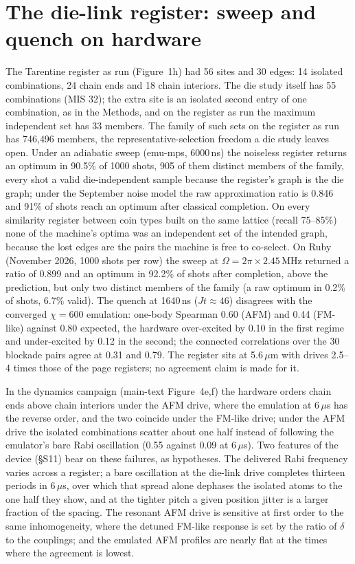 \documentclass[11pt,a4paper]{article}
\begin{document}
\section{The die-link register: sweep and quench on hardware}
\label{sec:si_die}
The Tarentine register as run (Figure~1h) had 56 sites and 30 edges: 14 isolated combinations, 24 chain ends and 18 chain interiors. The die study itself has 55 combinations (MIS 32); the extra site is an isolated second entry of one combination, as in the Methods, and on the register as run the maximum independent set has 33 members. The family of such sets on the register as run has 746{,}496 members, the representative-selection freedom a die study leaves open. Under an adiabatic sweep (emu-mps, 6000\,ns) the noiseless register returns an optimum in 90.5\% of 1000 shots, 905 of them distinct members of the family, every shot a valid die-independent sample because the register's graph is the die graph; under the September noise model the raw approximation ratio is 0.846 and 91\% of shots reach an optimum after classical completion. On every similarity register between coin types built on the same lattice (recall 75--85\%) none of the machine's optima was an independent set of the intended graph, because the lost edges are the pairs the machine is free to co-select. On Ruby (November 2026, 1000 shots per row) the sweep at $\Omega=2\pi\times2.45$\,MHz returned a ratio of 0.899 and an optimum in 92.2\% of shots after completion, above the prediction, but only two distinct members of the family (a raw optimum in 0.2\% of shots, 6.7\% valid). The quench at 1640\,ns ($Jt\approx46$) disagrees with the converged $\chi=600$ emulation: one-body Spearman 0.60 (AFM) and 0.44 (FM-like) against 0.80 expected, the hardware over-excited by 0.10 in the first regime and under-excited by 0.12 in the second; the connected correlations over the 30 blockade pairs agree at 0.31 and 0.79. The register sits at 5.6\,$\mu$m with drives 2.5--4 times those of the page registers; no agreement claim is made for it.

In the dynamics campaign (main-text Figure~4e,f) the hardware orders chain ends above chain interiors under the AFM drive, where the emulation at 6\,$\mu$s has the reverse order, and the two coincide under the FM-like drive; under the AFM drive the isolated combinations scatter about one half instead of following the emulator's bare Rabi oscillation (0.55 against 0.09 at 6\,$\mu$s). Two features of the device (\S S11) bear on these failures, as hypotheses. The delivered Rabi frequency varies across a register; a bare oscillation at the die-link drive completes thirteen periods in 6\,$\mu$s, over which that spread alone dephases the isolated atoms to the one half they show, and at the tighter pitch a given position jitter is a larger fraction of the spacing. The resonant AFM drive is sensitive at first order to the same inhomogeneity, where the detuned FM-like response is set by the ratio of $\delta$ to the couplings; and the emulated AFM profiles are nearly flat at the times where the agreement is lowest.
\end{document}
